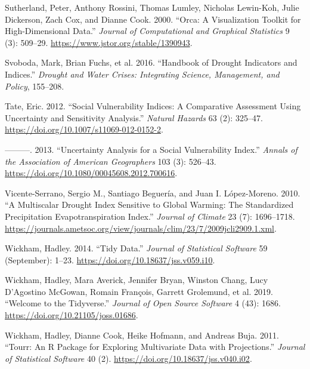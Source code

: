 \documentclass[
]{interact}
\newlength{\cslhangindent}
\newlength{\cslentryspacingunit} %
\newenvironment{CSLReferences}[2] %
 {%
  \setlength{\parindent}{0pt}
  \ifodd #1
  \let\oldpar\par
  \def\par{\hangindent=\cslhangindent\oldpar}
  \fi
  \setlength{\parskip}{#2\cslentryspacingunit}
 }%
 {}
\begin{document}
\begin{CSLReferences}{1}{0}
\leavevmode{}%
Sutherland, Peter, Anthony Rossini, Thomas Lumley, Nicholas Lewin-Koh,
Julie Dickerson, Zach Cox, and Dianne Cook. 2000. {``Orca: {A}
{Visualization} {Toolkit} for {High}-{Dimensional} {Data}.''}
\emph{Journal of Computational and Graphical Statistics} 9 (3): 509--29.
\url{https://www.jstor.org/stable/1390943}.

\leavevmode{}%
Svoboda, Mark, Brian Fuchs, et al. 2016. {``Handbook of Drought
Indicators and Indices.''} \emph{Drought and Water Crises: Integrating
Science, Management, and Policy}, 155--208.

\leavevmode{}%
Tate, Eric. 2012. {``Social Vulnerability Indices: A Comparative
Assessment Using Uncertainty and Sensitivity Analysis.''} \emph{Natural
Hazards} 63 (2): 325--47.
\url{https://doi.org/10.1007/s11069-012-0152-2}.

\leavevmode{}%
---------. 2013. {``Uncertainty {Analysis} for a {Social}
{Vulnerability} {Index}.''} \emph{Annals of the Association of American
Geographers} 103 (3): 526--43.
\url{https://doi.org/10.1080/00045608.2012.700616}.

\leavevmode{}%
Vicente-Serrano, Sergio M., Santiago Beguería, and Juan I. López-Moreno.
2010. {``A {Multiscalar} {Drought} {Index} {Sensitive} to {Global}
{Warming}: {The} {Standardized} {Precipitation} {Evapotranspiration}
{Index}.''} \emph{Journal of Climate} 23 (7): 1696--1718.
\url{https://journals.ametsoc.org/view/journals/clim/23/7/2009jcli2909.1.xml}.

\leavevmode{}%
Wickham, Hadley. 2014. {``Tidy {Data}.''} \emph{Journal of Statistical
Software} 59 (September): 1--23.
\url{https://doi.org/10.18637/jss.v059.i10}.

\leavevmode{}%
Wickham, Hadley, Mara Averick, Jennifer Bryan, Winston Chang, Lucy
D'Agostino McGowan, Romain François, Garrett Grolemund, et al. 2019.
{``Welcome to the {Tidyverse}.''} \emph{Journal of Open Source Software}
4 (43): 1686. \url{https://doi.org/10.21105/joss.01686}.

\leavevmode{}%
Wickham, Hadley, Dianne Cook, Heike Hofmann, and Andreas Buja. 2011.
{``Tourr: {An} {R} {Package} for {Exploring} {Multivariate} {Data} with
{Projections}.''} \emph{Journal of Statistical Software} 40 (2).
\url{https://doi.org/10.18637/jss.v040.i02}.


\end{CSLReferences}
\end{document}
